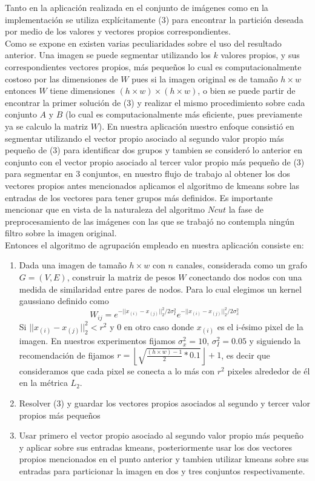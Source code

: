 \documentclass[conference]{IEEEtran}
\begin{document}
Tanto en la aplicación realizada en el conjunto de imágenes como en la implementación se utiliza explícitamente (3) para encontrar la partición deseada por medio de los valores y vectores propios correspondientes.\\
Como se expone en \cite{Ncut} existen varias peculiaridades sobre el uso del resultado anterior. Una imagen se puede segmentar utilizando los $k$ valores propios, y sus correspondientes vectores propios, más pequeños lo cual es computacionalmente costoso por las dimensiones de $W$ pues si la imagen original es de tamaño $h \times w$ entonces $W$ tiene dimensiones $(h\times w)\times (h\times w)$, o bien se puede partir de encontrar la primer solución de (3) y realizar el mismo procedimiento sobre cada conjunto $A$ y $B$ (lo cual es computacionalmente más eficiente, pues previamente ya se calculo la matriz $W$). En nuestra aplicación nuestro enfoque consistió en segmentar utilizando el vector propio asociado al segundo valor propio más pequeño de (3) para identificar dos grupos y tambien se consideró lo anterior en conjunto con el vector propio asociado al tercer valor propio más pequeño de (3) para segmentar en 3 conjuntos, en nuestro flujo de trabajo al obtener los dos vectores propios antes mencionados aplicamos el algoritmo de kmeans sobre las entradas de los vectores para tener grupos más definidos. Es importante mencionar que en vista de la naturaleza del algoritmo $Ncut$ la fase de preprocesamiento de las imágenes con las que se trabajó no contempla ningún filtro sobre la imagen original.   \\
Entonces el algoritmo de agrupación empleado en nuestra aplicación consiste en:\\
\begin{enumerate}
\item Dada una imagen de tamaño $h \times w$ con $n$ canales, considerada como un grafo $G=(V,E)$, construir la matriz de pesos $W$ conectando dos nodos con una medida de similaridad entre pares de nodos. Para lo cual elegimos un kernel gaussiano definido como 
\[
W_{ij}= e^{-||x_{(i)}-x_{(j)}||^2_2/2\sigma^2_I}e^{-||x_{(i)}-x_{(j)}||^2_2/2\sigma_x^2}
\] 
Si $||x_{(i)}-x_{(j)}||_2^2 < r^2$ y 0 en otro caso donde $x_{(i)}$ es el i-ésimo pixel de la imagen. En nuestros experimentos fijamos $\sigma_x^2=10$, $\sigma_I^2=0.05$ y siguiendo la recomendación de \cite{Ncut} fijamos $r = \left \lfloor
 \sqrt{\frac{(h\times w)-1}{2}*0.1}\right \rfloor +1 $, es decir que consideramos que cada pixel se conecta a lo más con $r^2$ pixeles alrededor de él en la métrica $L_2$.\\  
\item Resolver (3) y guardar los vectores propios asociados al segundo y tercer valor propios más pequeños 
\item Usar primero el vector propio asociado al segundo valor propio más pequeño y aplicar sobre sus entradas kmeans, posteriormente usar los dos vectores propios mencionados en el punto anterior y tambien utilizar kmeans sobre sus entradas para particionar la imagen en dos y tres conjuntos respectivamente.
\end{enumerate}
\end{document}
